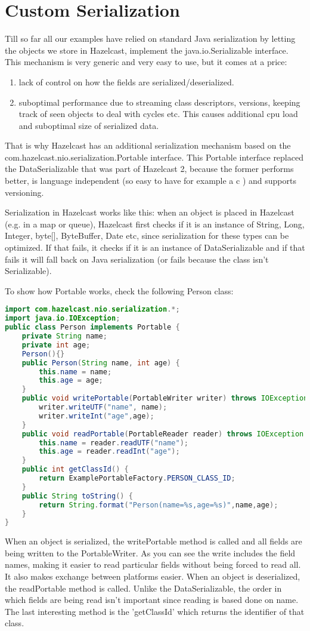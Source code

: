 \chapter{Custom Serialization}
Till so far all our examples have relied on standard Java serialization by letting the objects we store in Hazelcast, implement the java.io.Serializable interface. This mechanism is very generic and very easy to use, but it comes at a price:
\begin{enumerate}
\item lack of control on how the fields are serialized/deserialized.
\item suboptimal performance due to streaming class descriptors, versions, keeping track of seen objects to deal with cycles etc. This causes additional cpu load and suboptimal size of serialized data.
\end{enumerate}
That is why Hazelcast has an additional serialization mechanism based on the com.hazelcast.nio.serialization.Portable interface. This Portable interface replaced the DataSerializable that was part of Hazelcast 2, because the former performs better, is language independent (so easy to have for example a c ) and supports versioning.

Serialization in Hazelcast works like this: when an object is placed in Hazelcast (e.g. in a map or queue), Hazelcast first checks if it is an instance of String, Long, Integer, byte[], ByteBuffer, Date etc, since serialization for these types can be optimized. If that fails, it checks if it is an instance of DataSerializable and if that fails it will fall back on Java serialization (or fails because the class isn't Serializable). 

To show how Portable works, check the following Person class:
\begin{lstlisting}[language=java]
import com.hazelcast.nio.serialization.*;
import java.io.IOException;
public class Person implements Portable {
    private String name;
    private int age;
    Person(){}
    public Person(String name, int age) {
        this.name = name;
        this.age = age;
    }
    public void writePortable(PortableWriter writer) throws IOException {
        writer.writeUTF("name", name);
        writer.writeInt("age",age);
    }
    public void readPortable(PortableReader reader) throws IOException {
        this.name = reader.readUTF("name");
        this.age = reader.readInt("age");
    }
    public int getClassId() {
        return ExamplePortableFactory.PERSON_CLASS_ID;
    }
    public String toString() {
        return String.format("Person(name=%s,age=%s)",name,age);
    }
}
\end{lstlisting}
When an object is serialized, the writePortable method is called and all fields are being written to the PortableWriter. As you can see the write includes the field names, making it easier to read particular fields without being forced to read all. It also makes exchange between platforms easier. When an object is deserialized, the readPortable method is called. Unlike the DataSerializable, the order in which fields are being read isn't important since reading is based done on name. The last interesting method is the 'getClassId' which returns the identifier of that class. 

